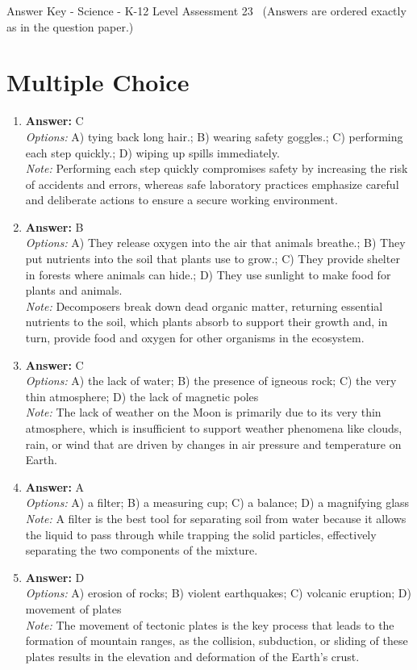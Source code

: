 \documentclass[12pt]{article}
\begin{document}
\begin{center}
Answer Key - Science - K-12 Level Assessment 23 \
\small (Answers are ordered exactly as in the question paper.)
\end{center}

\section*{Multiple Choice}
\begin{enumerate}[label=\arabic*.]
\item \textbf{Answer:} C
\\ \textit{Options:} A) tying back long hair.; B) wearing safety goggles.; C) performing each step quickly.; D) wiping up spills immediately.
\\ \textit{Note:} Performing each step quickly compromises safety by increasing the risk of accidents and errors, whereas safe laboratory practices emphasize careful and deliberate actions to ensure a secure working environment.
\item \textbf{Answer:} B
\\ \textit{Options:} A) They release oxygen into the air that animals breathe.; B) They put nutrients into the soil that plants use to grow.; C) They provide shelter in forests where animals can hide.; D) They use sunlight to make food for plants and animals.
\\ \textit{Note:} Decomposers break down dead organic matter, returning essential nutrients to the soil, which plants absorb to support their growth and, in turn, provide food and oxygen for other organisms in the ecosystem.
\item \textbf{Answer:} C
\\ \textit{Options:} A) the lack of water; B) the presence of igneous rock; C) the very thin atmosphere; D) the lack of magnetic poles
\\ \textit{Note:} The lack of weather on the Moon is primarily due to its very thin atmosphere, which is insufficient to support weather phenomena like clouds, rain, or wind that are driven by changes in air pressure and temperature on Earth.
\item \textbf{Answer:} A
\\ \textit{Options:} A) a filter; B) a measuring cup; C) a balance; D) a magnifying glass
\\ \textit{Note:} A filter is the best tool for separating soil from water because it allows the liquid to pass through while trapping the solid particles, effectively separating the two components of the mixture.
\item \textbf{Answer:} D
\\ \textit{Options:} A) erosion of rocks; B) violent earthquakes; C) volcanic eruption; D) movement of plates
\\ \textit{Note:} The movement of tectonic plates is the key process that leads to the formation of mountain ranges, as the collision, subduction, or sliding of these plates results in the elevation and deformation of the Earth's crust.
\end{enumerate}
\end{document}
